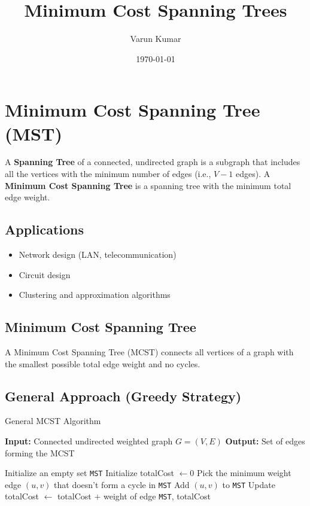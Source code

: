 \documentclass[14pt,a4paper]{extarticle}
\title{Minimum Cost Spanning Trees}
\author{Varun Kumar}
\date{\today}
\begin{document}
\maketitle
\tableofcontents
\lstlistoflistings
\newpage

\section{Minimum Cost Spanning Tree (MST)}

A \textbf{Spanning Tree} of a connected, undirected graph is a subgraph that includes all the vertices with the minimum number of edges (i.e., $V-1$ edges). A \textbf{Minimum Cost Spanning Tree} is a spanning tree with the minimum total edge weight.

\subsection*{Applications}
\begin{itemize}
    \item Network design (LAN, telecommunication)
    \item Circuit design
    \item Clustering and approximation algorithms
\end{itemize}

\subsection{Minimum Cost Spanning Tree}

A Minimum Cost Spanning Tree (MCST) connects all vertices of a graph with the smallest possible total edge weight and no cycles.

\subsection{General Approach (Greedy Strategy)}

\begin{algorithm}[H]
\caption{General MCST Algorithm}
\begin{algorithmic}[1]
\State \textbf{Input:} Connected undirected weighted graph \(G = (V, E)\)
\State \textbf{Output:} Set of edges forming the MCST

    \State Initialize an empty set \texttt{MST}
    \State Initialize totalCost \( \gets 0 \)
        \State Pick the minimum weight edge \( (u, v) \) that doesn't form a cycle in \texttt{MST}
        \State Add \( (u, v) \) to \texttt{MST}
        \State Update totalCost \( \gets \) totalCost $+$ weight of edge
    \EndWhile
    \State \Return \texttt{MST}, totalCost
\EndFunction
\end{algorithmic}
\end{algorithm}
\end{document}
